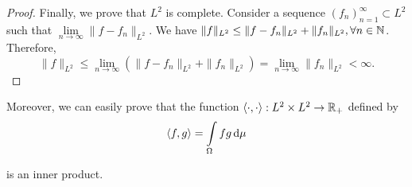 \begin{proof}
  Finally, we prove that $L^2$ is complete. Consider a sequence $(f_n)_{n=1}^\infty\subset L^2$ such that $\lim\limits_{n\to\infty}\|f-f_n\|_{L^2}$. We have $\|f\|_{L^2}\le \|f-f_n\|_{L^2} + \|f_n\|_{L^2}, \forall n\in \mathbb{N}$. Therefore,
  $$\|f\|_{L^2} \le \lim\limits_{n\to\infty}\left(\|f-f_n\|_{L^2} + \|f_n\|_{L^2}\right) = \lim\limits_{n\to\infty} \|f_n\|_{L^2} < \infty.$$
\end{proof}

Moreover, we can easily prove that the function $\langle\cdot,\cdot\rangle : L^2\times L^2\to\mathbb{R}_+$ defined by
\begin{equation}
  \langle f,g\rangle = \int\limits_\Omega fg \,\mathrm{d} \mu
\end{equation}

is an inner product.
